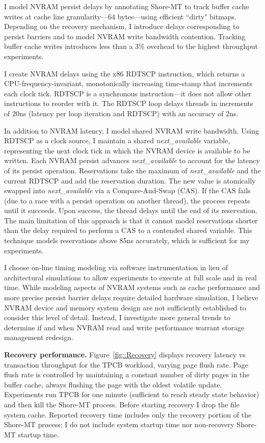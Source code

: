 I model NVRAM persist delays by annotating Shore-MT to track buffer cache writes at cache line granularity---64 bytes---using efficient ``dirty" bitmaps.
Depending on the recovery mechanism, I introduce delays corresponding to persist barriers and to model NVRAM write bandwidth contention.
Tracking buffer cache writes introduces less than a 3\% overhead to the highest throughput experiments.

I create NVRAM delays using the x86 RDTSCP instruction, which returns a CPU-frequency-invariant, monotonically increasing time-stamp that increments each clock tick.
RDTSCP is a synchronous instruction---it does not allow other instructions to reorder with it.
The RDTSCP loop delays threads in increments of 20ns (latency per loop iteration and RDTSCP) with an accuracy of 2ns.

In addition to NVRAM latency, I model shared NVRAM write bandwidth.
Using RDTSCP as a clock source, I maintain a shared \emph{next\_available} variable, representing the next clock tick in which the NVRAM device is available to be written.
Each NVRAM persist advances \emph{next\_available} to account for the latency of its persist operation.
Reservations take the maximum of \emph{next\_available} and the current RDTSCP and add the reservation duration.
The new value is atomically swapped into \emph{next\_available} via a Compare-And-Swap (CAS).
If the CAS fails (due to a race with a persist operation on another thread), the process repeats until it succeeds.
Upon success, the thread delays until the end of its reservation.
The main limitation of this approach is that it cannot model reservations shorter than the delay required to perform a CAS to a contended shared variable.
This technique models reservations above 85ns accurately, which is sufficient for my experiments.

I choose on-line timing modeling via software instrumentation in lieu of architectural simulations to allow experiments to execute at full scale and in real time.
While modeling aspects of NVRAM systems such as cache performance and more precise persist barrier delays require detailed hardware simulation, I believe NVRAM device and memory system design are not sufficiently established to consider this level of detail.
Instead, I investigate more general trends to determine if and when NVRAM read and write performance warrant storage management redesign.

\textbf{Recovery performance.} Figure~\ref{fig::Recovery} displays recovery latency vs transaction throughput for the TPCB workload, varying page flush rate.
Page flush rate is controlled by maintaining a constant number of dirty pages in the buffer cache, always flushing the page with the oldest volatile update.
Experiments run TPCB for one minute (sufficient to reach steady state behavior) and then kill the Shore-MT process.
Before starting recovery I drop the file system cache.
Reported recovery time includes only the recovery portion of the Shore-MT process; I do not include system startup time nor non-recovery Shore-MT startup time.


